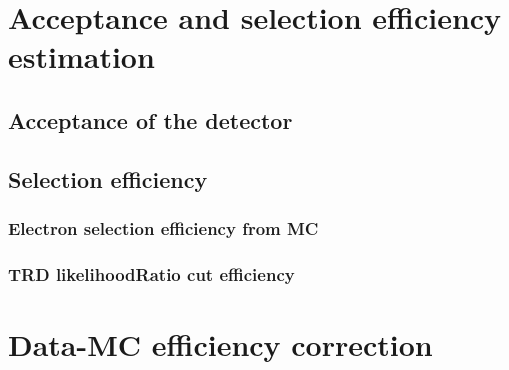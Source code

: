 \section{Acceptance and selection efficiency estimation}

\subsection{Acceptance of the detector}

\subsection{Selection efficiency}
\subsubsection{Electron selection efficiency from MC}
\subsubsection{TRD likelihoodRatio cut efficiency}\label{sec:EffTRD}

\section{Data-MC efficiency correction}\label{sec:EpsiCorr}